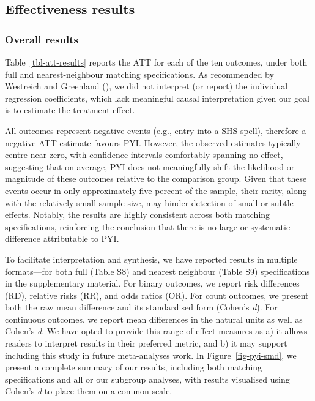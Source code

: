 \documentclass[
  jou,
  floatsintext,
  longtable,
  nolmodern,
  notxfonts,
  notimes,
  colorlinks=true,linkcolor=blue,citecolor=blue,urlcolor=blue]{apa7}
\begin{document}
\subsection{Effectiveness results}\label{effectiveness-results}

\subsubsection{Overall results}\label{overall-results}

Table~\ref{tbl-att-results} reports the ATT for each of the ten
outcomes, under both full and nearest-neighbour matching specifications.
As recommended by Westreich and Greenland
(), we did not interpret
(or report) the individual regression coefficients, which lack
meaningful causal interpretation given our goal is to estimate the
treatment effect.

All outcomes represent negative events (e.g., entry into a SHS spell),
therefore a negative ATT estimate favours PYI. However, the observed
estimates typically centre near zero, with confidence intervals
comfortably spanning no effect, suggesting that on average, PYI does not
meaningfully shift the likelihood or magnitude of these outcomes
relative to the comparison group. Given that these events occur in only
approximately five percent of the sample, their rarity, along with the
relatively small sample size, may hinder detection of small or subtle
effects. Notably, the results are highly consistent across both matching
specifications, reinforcing the conclusion that there is no large or
systematic difference attributable to PYI.

To facilitate interpretation and synthesis, we have reported results in
multiple formats---for both full (Table S8) and nearest neighbour (Table
S9) specifications in the supplementary material. For binary outcomes,
we report risk differences (RD), relative risks (RR), and odds ratios
(OR). For count outcomes, we present both the raw mean difference and
its standardised form (Cohen's \emph{d}). For continuous outcomes, we
report mean differences in the natural units as well as Cohen's
\emph{d}. We have opted to provide this range of effect measures as a)
it allows readers to interpret results in their preferred metric, and b)
it may support including this study in future meta-analyses work. In
Figure~\ref{fig-pyi-smd}, we present a complete summary of our results,
including both matching specifications and all or our subgroup analyses,
with results visualised using Cohen's \emph{d} to place them on a common
scale.
\end{document}
